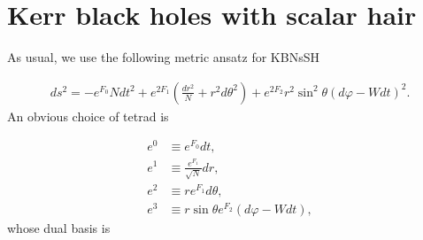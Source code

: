 \documentclass[a4paper]{article}
\begin{document}
%
%
%
%
%
%

\section*{Kerr black holes with scalar hair}

As usual, we use the following metric ansatz for KBNsSH

\begin{align*}
   ds^2 = -e^{F_0}Ndt^2 + e^{2F_1}\left( \frac{dr^2}{N} + r^2d\theta^2 \right) + e^{2F_2}r^2\sin^2\theta \left(d\varphi - Wdt \right)^2.
\end{align*}
An obvious choice of tetrad is

\begin{align*}
  e^0 &\equiv e^{F_0}dt, \\
  e^1 &\equiv \frac{e^{F_1}}{\sqrt{N}}dr, \\
  e^2 &\equiv re^{F_1}d\theta, \\
  e^3 &\equiv r\sin\theta e^{F_2}(d\varphi-Wdt),
\end{align*}
whose dual basis is
\end{document}
